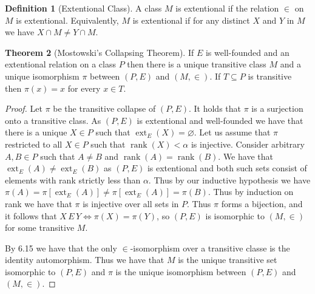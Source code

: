 \documentclass{article}
\theoremstyle{definition}
\newtheorem{thm}{Theorem}[section]
\newtheorem{defn}[thm]{Definition}
\newcommand*{\mtset}{\ensuremath{\varnothing}}
\DeclareMathOperator{\rank}{rank}
\DeclareMathOperator{\ext}{ext}
\begin{document}
\begin{defn}[Extentional Class]
    A class $M$ is extentional if the relation $\in$ on $M$ is extentional. Equivalently, $M$ is extentional if for any distinct $X$ and $Y$ in $M$ we have $X \cap M \ne Y \cap M$. 
\end{defn}

\begin{thm}[Mostowski's Collapsing Theorem]
    If $E$ is well-founded and an extentional relation on a class $P$ then there is a unique transitive class $M$ and a unique isomorphism $\pi$ between $(P, E)$ and $(M, \in)$. If $T \subseteq P$ is transitive then $\pi(x) = x$ for every $x \in T$.
\end{thm}

\begin{proof}
    Let $\pi$ be the transitive collapse of $(P, E)$. It holds that $\pi$ is a surjection onto a transitive class. As $(P, E)$ is extentional and well-founded we have that there is a unique $X \in P$ such that $\ext_E(X) = \mtset$. Let us assume that $\pi$ restricted to all $X \in P$ such that $\rank(X) < \alpha$ is injective. Consider arbitrary $A, B \in P$ such that $A \ne B$ and $\rank(A) = \rank(B)$. We have that $\ext_E(A) \ne \ext_E(B)$ as $(P, E)$ is extentional and both such sets consist of elements with rank strictly less than $\alpha$. Thus by our inductive hypothesis we have $\pi(A) = \pi[\ext_E(A)] \ne \pi[\ext_E(A)] = \pi(B)$. Thus by induction on rank we have that $\pi$ is injective over all sets in $P$. Thus $\pi$ forms a bijection, and it follows that $X \, E \, Y \iff \pi(X) = \pi(Y)$, so $(P, E)$ is isomorphic to $(M, \in)$ for some transitive $M$.

    By 6.15 we have that the only $\in$-isomorphism over a transitive classe is the identity automorphism. Thus we have that $M$ is the unique transitive set isomorphic to $(P, E)$ and $\pi$ is the unique isomorphism between $(P, E)$ and $(M, \in)$. 
\end{proof}
\end{document}
